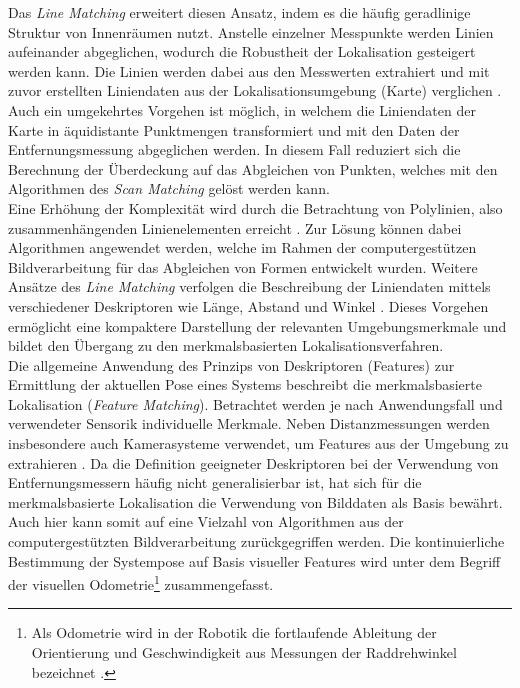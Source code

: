 Das \textit{Line Matching} erweitert diesen Ansatz, indem es die häufig geradlinige Struktur von Innenräumen nutzt. Anstelle einzelner Messpunkte werden Linien aufeinander abgeglichen, wodurch die Robustheit der Lokalisation gesteigert werden kann. Die Linien werden dabei aus den Messwerten extrahiert und mit zuvor erstellten Liniendaten aus der Lokalisationsumgebung (Karte) verglichen \cite{Cox1991}\cite{Gutmann1999}. Auch ein umgekehrtes Vorgehen ist möglich, in welchem die Liniendaten der Karte in äquidistante Punktmengen transformiert und mit den Daten der Entfernungsmessung abgeglichen werden. In diesem Fall reduziert sich die Berechnung der Überdeckung auf das Abgleichen von Punkten, welches mit den Algorithmen des \textit{Scan Matching} gelöst werden kann.\\

Eine Erhöhung der Komplexität wird durch die Betrachtung von Polylinien, also zusammenhängenden Linienelementen erreicht \cite{Wolter2004}. Zur Lösung können dabei Algorithmen angewendet werden, welche im Rahmen der computergestützen Bildverarbeitung für das Abgleichen von Formen entwickelt wurden. Weitere Ansätze des \textit{Line Matching} verfolgen die Beschreibung der Liniendaten mittels verschiedener Deskriptoren wie Länge, Abstand und Winkel \cite{Frey2014}\cite{Garulli2005}. Dieses Vorgehen ermöglicht eine kompaktere Darstellung der relevanten Umgebungsmerkmale und bildet den Übergang zu den merkmalsbasierten Lokalisationsverfahren.\\

Die allgemeine Anwendung des Prinzips von Deskriptoren (Features) zur Ermittlung der aktuellen Pose eines Systems beschreibt die merkmalsbasierte Lokalisation (\textit{Feature Matching}). Betrachtet werden je nach Anwendungsfall und verwendeter Sensorik individuelle Merkmale. Neben Distanzmessungen \cite{Tomono2004} werden insbesondere auch Kamerasysteme verwendet, um Features aus der Umgebung zu extrahieren \cite{Se2001}. Da die Definition geeigneter Deskriptoren bei der Verwendung von Entfernungsmessern häufig nicht generalisierbar ist, hat sich für die merkmalsbasierte Lokalisation die Verwendung von Bilddaten als Basis bewährt. Auch hier kann somit auf eine Vielzahl von Algorithmen aus der computergestützten Bildverarbeitung zurückgegriffen werden. Die kontinuierliche Bestimmung der Systempose auf Basis visueller Features wird unter dem Begriff der visuellen Odometrie\footnote{Als Odometrie wird in der Robotik die fortlaufende Ableitung der Orientierung und Geschwindigkeit aus Messungen der Raddrehwinkel bezeichnet \cite{Hertzberg2012}.} \cite{Mccarthy2003} zusammengefasst.\\

